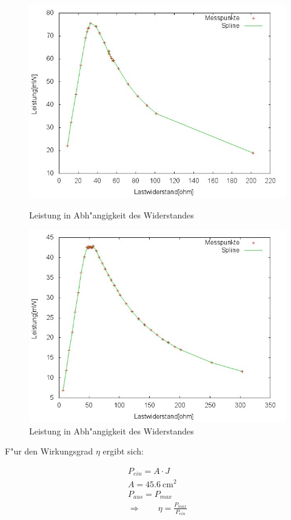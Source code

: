 \begin{figure}[htbp]
		\centering
		\includegraphics[width = 12cm]{img/526p.jpg}
		\caption{Leistung in Abh"angigkeit des Widerstandes}
		\label{PR3}

		\centering
		\includegraphics[width = 12cm]{img/718p.jpg}
		\caption{Leistung in Abh"angigkeit des Widerstandes}
		\label{PR4}
	\end{figure}
\newpage
	F"ur den Wirkungsgrad $\eta$ ergibt sich:

	\begin{eqnarray*}
		P_{ein} = A \cdot J\\
		A = \SI{45.6}{\centi\meter^2}\\
		P_{aus} = P_{max}\\
		\Rightarrow \qquad \eta = \frac{P_{max}}{P_{ein}} 
	\end{eqnarray*}


